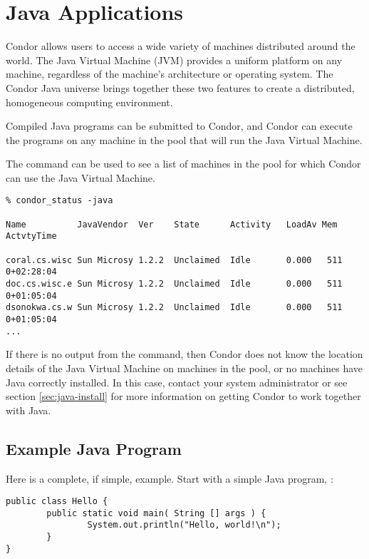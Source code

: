 
\section{\label{sec:Java}Java Applications}

Condor allows users to access a wide variety of
machines distributed around the world.
The Java Virtual Machine (JVM)
provides a uniform platform on any machine, regardless of the
machine's architecture or operating system.
The Condor Java universe brings together these
two features to create a distributed, homogeneous computing environment.

Compiled Java programs can be submitted to Condor, and Condor
can execute the programs on any machine in the pool that will run
the Java Virtual Machine.


The  command can be used to see a list of
machines in the pool for which Condor can use the Java Virtual
Machine.

\footnotesize
\begin{verbatim}
% condor_status -java

Name          JavaVendor  Ver    State      Activity   LoadAv Mem   ActvtyTime

coral.cs.wisc Sun Microsy 1.2.2  Unclaimed  Idle       0.000   511  0+02:28:04
doc.cs.wisc.e Sun Microsy 1.2.2  Unclaimed  Idle       0.000   511  0+01:05:04
dsonokwa.cs.w Sun Microsy 1.2.2  Unclaimed  Idle       0.000   511  0+01:05:04
...
\end{verbatim}
\normalsize

If there is no output from the
 command,
then Condor does not know the location details of the Java Virtual
Machine on machines in the pool,
or no machines have Java correctly installed.
In this case,
contact your system administrator or see section \ref{sec:java-install}
for more information on getting Condor to work together
with Java.

\subsection{Example Java Program}

Here is a complete, if simple, example.
Start with a simple Java program, :

\begin{verbatim}
public class Hello {
        public static void main( String [] args ) {
                System.out.println("Hello, world!\n");
        }
}
\end{verbatim}

